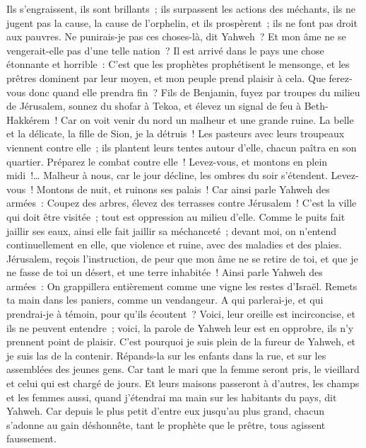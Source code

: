 \begin{multicols}{2}
Ils s'engraissent, ils sont brillants~; ils surpassent les actions des méchants, ils ne jugent pas la cause, la cause de l'orphelin, et ils prospèrent~; ils ne font pas droit aux pauvres.
Ne punirais-je pas ces choses-là, dit Yahweh~? Et mon âme ne se vengerait-elle pas d'une telle nation~?
Il est arrivé dans le pays une chose étonnante et horrible~:
C'est que les prophètes prophétisent le mensonge, et les prêtres dominent par leur moyen, et mon peuple prend plaisir à cela. Que ferez-vous donc quand elle prendra fin~?
\VerseOne{}Fils de Benjamin, fuyez par troupes du milieu de Jérusalem, sonnez du shofar à Tekoa, et élevez un signal de feu à Beth-Hakkérem~! Car on voit venir du nord un malheur et une grande ruine.
La belle et la délicate, la fille de Sion, je la détruis~!
Les pasteurs avec leurs troupeaux viennent contre elle~; ils plantent leurs tentes autour d'elle, chacun paîtra en son quartier.
Préparez le combat contre elle~! Levez-vous, et montons en plein midi~!… Malheur à nous, car le jour décline, les ombres du soir s'étendent.
Levez-vous~! Montons de nuit, et ruinons ses palais~!
Car ainsi parle Yahweh des armées~: Coupez des arbres, élevez des terrasses contre Jérusalem~! C'est la ville qui doit être visitée~; tout est oppression au milieu d'elle.
Comme le puits fait jaillir ses eaux, ainsi elle fait jaillir sa méchanceté~; devant moi, on n'entend continuellement en elle, que violence et ruine, avec des maladies et des plaies.
Jérusalem, reçois l'instruction, de peur que mon âme ne se retire de toi, et que je ne fasse de toi un désert, et une terre inhabitée~!
Ainsi parle Yahweh des armées~: On grappillera entièrement comme une vigne les restes d'Israël. Remets ta main dans les paniers, comme un vendangeur.
A qui parlerai-je, et qui prendrai-je à témoin, pour qu'ils écoutent~? Voici, leur oreille est incirconcise, et ils ne peuvent entendre~; voici, la parole de Yahweh leur est en opprobre, ils n'y prennent point de plaisir.
C'est pourquoi je suis plein de la fureur de Yahweh, et je suis las de la contenir. Répands-la sur les enfants dans la rue, et sur les assemblées des jeunes gens. Car tant le mari que la femme seront pris, le vieillard et celui qui est chargé de jours.
Et leurs maisons passeront à d'autres, les champs et les femmes aussi, quand j'étendrai ma main sur les habitants du pays, dit Yahweh.
Car depuis le plus petit d'entre eux jusqu'au plus grand, chacun s'adonne au gain déshonnête, tant le prophète que le prêtre, tous agissent faussement.

\end{multicols}
